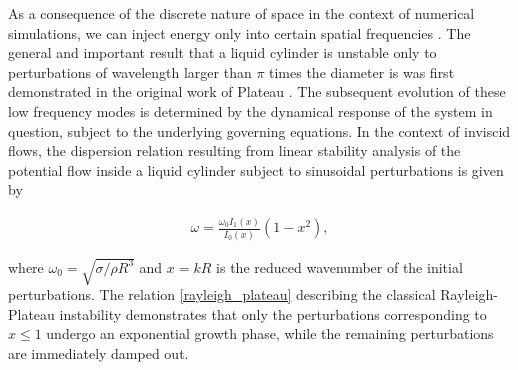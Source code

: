As a consequence of the discrete nature of space in
the context of numerical simulations, we can inject energy
only into certain spatial frequencies . 
The general and important result that a liquid cylinder is unstable 
only to perturbations of wavelength larger than $\pi$ times the diameter
is was first demonstrated in the original work of Plateau \cite{plateau1849}.
The subsequent evolution of these low frequency modes  
is determined by the dynamical response of the system in question, 
subject to the underlying governing equations. 
In the context of inviscid flows, the dispersion relation
resulting from linear stability analysis of the potential flow
inside a liquid cylinder subject to sinusoidal perturbations is given by

\begin{align}
\omega = \frac{\omega_0 I_1(x)}{I_0(x)} \left(1 - x^2 \right) , 
\label{rayleigh_plateau}
\end{align}
 

where $\omega_0 = \sqrt{\sigma/ \rho R^3}$ and $x= kR$ is the 
reduced wavenumber of the initial perturbations. 
The relation \eqref{rayleigh_plateau} describing the classical 
Rayleigh-Plateau instability \cite{rayleigh1879a, plateau1849} 
demonstrates that only the perturbations corresponding to $x \leq 1 $ 
undergo an exponential growth phase, while the remaining perturbations 
are immediately damped out. 

